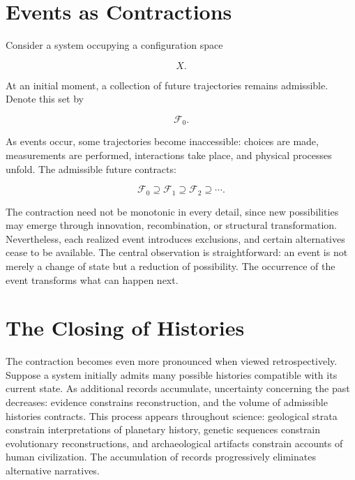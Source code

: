 \documentclass[11pt,oneside]{book}
\theoremstyle{plain}
\theoremstyle{definition}
\theoremstyle{remark}
\begin{document}
\section{Events as Contractions}

Consider a system occupying a configuration space

\begin{equation}
X.
\end{equation}

At an initial moment, a collection of future trajectories remains admissible. Denote this set by

\begin{equation}
\mathcal{F}_0.
\end{equation}

As events occur, some trajectories become inaccessible: choices are made, measurements are performed, interactions take place, and physical processes unfold. The admissible future contracts:

\begin{equation}
\mathcal{F}_0
\supseteq
\mathcal{F}_1
\supseteq
\mathcal{F}_2
\supseteq
\cdots.
\end{equation}

The contraction need not be monotonic in every detail, since new possibilities may emerge through innovation, recombination, or structural transformation. Nevertheless, each realized event introduces exclusions, and certain alternatives cease to be available. The central observation is straightforward: an event is not merely a change of state but a reduction of possibility. The occurrence of the event transforms what can happen next.

\section{The Closing of Histories}

The contraction becomes even more pronounced when viewed retrospectively. Suppose a system initially admits many possible histories compatible with its current state. As additional records accumulate, uncertainty concerning the past decreases: evidence constrains reconstruction, and the volume of admissible histories contracts. This process appears throughout science: geological strata constrain interpretations of planetary history, genetic sequences constrain evolutionary reconstructions, and archaeological artifacts constrain accounts of human civilization. The accumulation of records progressively eliminates alternative narratives.
\end{document}
